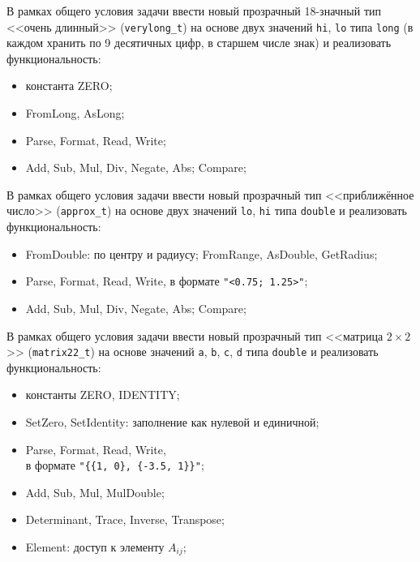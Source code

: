 
\begin{zztask}
В рамках общего условия задачи ввести новый прозрачный 18-значный тип <<очень длинный>>
(\texttt{verylong\_t}) на основе двух значений \texttt{hi}, \texttt{lo} типа
\texttt{long} (в каждом хранить по 9 десятичных цифр, в старшем числе знак) и
реализовать функциональность:
%
\begin{itemize}
\item константа ZERO;
\item FromLong, AsLong;
\item Parse, Format, Read, Write;
\item Add, Sub, Mul, Div, Negate, Abs; Compare;
\end{itemize}
\end{zztask}


\begin{zztask}
В рамках общего условия задачи ввести новый прозрачный тип <<приближённое число>>
(\texttt{approx\_t}) на основе двух значений \texttt{lo}, \texttt{hi} типа
\texttt{double} и реализовать функциональность:
%
\begin{itemize}
\item FromDouble: по центру и радиусу; FromRange, AsDouble, GetRadius;
\item Parse, Format, Read, Write, в формате \verb|"<0.75; 1.25>"|;
\item Add, Sub, Mul, Div, Negate, Abs; Compare;
\end{itemize}
\end{zztask}


\begin{zztask}
В рамках общего условия задачи ввести новый прозрачный тип <<матрица $2\times 2$>>
(\texttt{matrix22\_t}) на основе значений \texttt{a}, \texttt{b}, \texttt{c},
\texttt{d} типа \texttt{double} и реализовать функциональность:
%
\begin{itemize}
\item константы ZERO, IDENTITY;
\item SetZero, SetIdentity: заполнение как нулевой и единичной;
\item Parse, Format, Read, Write,\\ в формате \verb|"{{1, 0}, {-3.5, 1}}"|;
\item Add, Sub, Mul, MulDouble;
\item Determinant, Trace, Inverse, Transpose;
\item Element: доступ к элементу $A_{ij}$;
\end{itemize}
\end{zztask}


